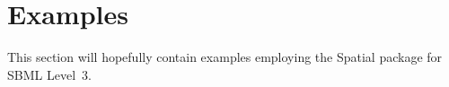 
\section{Examples}
\label{examples}

This section will hopefully contain examples employing the Spatial package for SBML Level~3.












